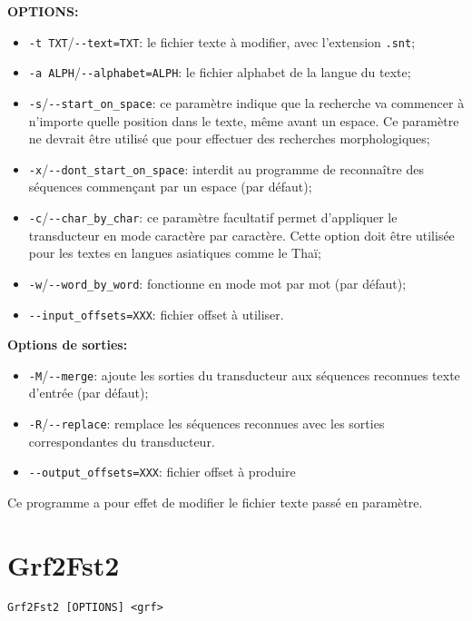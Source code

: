 \bigskip
\noindent \textbf{OPTIONS:}
\begin{itemize}
  \item \verb+-t TXT+/\verb+--text=TXT+: le fichier texte à modifier, avec l’extension \verb+.snt+;
  
  \item \verb+-a ALPH+/\verb+--alphabet=ALPH+: le fichier alphabet de la langue du
  texte;

  \item \verb+-s+/\verb+--start_on_space+: ce paramètre indique que la recherche va commencer à
  	  n'importe quelle position dans le texte, même avant un espace. Ce paramètre ne devrait
  	  être utilisé que pour effectuer des recherches morphologiques;
  	  
  \item \verb+-x+/\verb+--dont_start_on_space+: interdit au programme de 
  	  reconnaître des séquences commençant par un espace (par défaut);
  
  \item \verb+-c+/\verb+--char_by_char+: ce paramètre facultatif permet d’appliquer le transducteur
  en mode caractère par caractère. Cette option doit être utilisée pour les textes en  langues
  asiatiques comme le Thaï;

  \item \verb+-w+/\verb+--word_by_word+: fonctionne en mode mot par mot (par défaut);
  \item \verb+--input_offsets=XXX+: fichier offset à utiliser.  
\end{itemize}

\bigskip
\noindent \textbf{Options de sorties:}
\begin{itemize}
\item \verb+-M+/\verb+--merge+: ajoute les sorties du transducteur aux séquences reconnues texte
	d'entrée (par défaut);
\item \verb+-R+/\verb+--replace+: remplace les séquences reconnues avec les sorties correspondantes
	du transducteur.
\item \verb+--output_offsets=XXX+: fichier offset à produire	
\end{itemize}

\bigskip
\noindent Ce programme a pour effet de modifier le fichier texte passé en paramètre.







\section{Grf2Fst2}
\verb+Grf2Fst2 [OPTIONS] <grf>+

